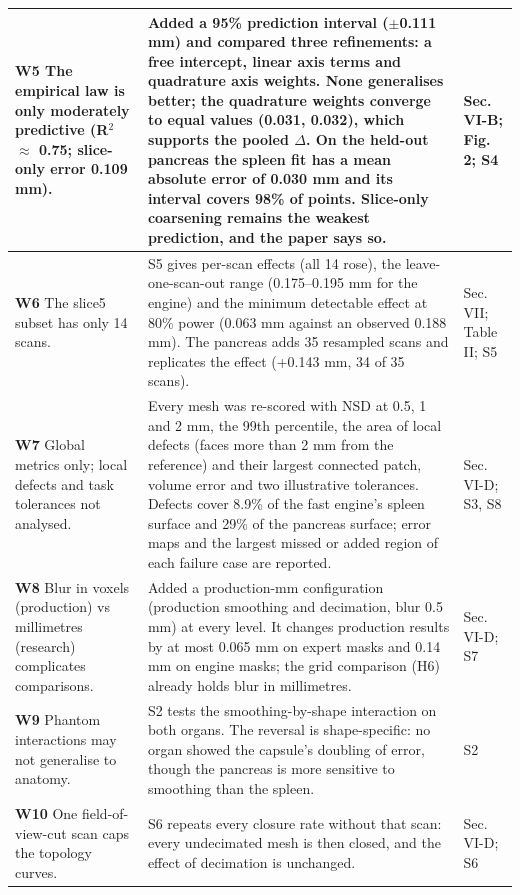\documentclass[11pt]{article}
\begin{document}
\begin{longtable}{@{}>{\raggedright\arraybackslash}p{}>{\raggedright\arraybackslash}p{}>{\raggedright\arraybackslash}p{}@{}}
\textbf{W5} The empirical law is only moderately predictive (R$^2$ $\approx$ 0.75; slice-only error 0.109 mm). & Added a 95\% prediction interval ($\pm$0.111 mm) and compared three refinements: a free intercept, linear axis terms and quadrature axis weights. None generalises better; the quadrature weights converge to equal values (0.031, 0.032), which supports the pooled $\Delta$. On the held-out pancreas the spleen fit has a mean absolute error of 0.030 mm and its interval covers 98\% of points. Slice-only coarsening remains the weakest prediction, and the paper says so. & Sec. VI-B; Fig. 2; S4 \\ \midrule
\textbf{W6} The slice5 subset has only 14 scans. & S5 gives per-scan effects (all 14 rose), the leave-one-scan-out range (0.175–0.195 mm for the engine) and the minimum detectable effect at 80\% power (0.063 mm against an observed 0.188 mm). The pancreas adds 35 resampled scans and replicates the effect (+0.143 mm, 34 of 35 scans). & Sec. VII; Table II; S5 \\ \midrule
\textbf{W7} Global metrics only; local defects and task tolerances not analysed. & Every mesh was re-scored with NSD at 0.5, 1 and 2 mm, the 99th percentile, the area of local defects (faces more than 2 mm from the reference) and their largest connected patch, volume error and two illustrative tolerances. Defects cover 8.9\% of the fast engine's spleen surface and 29\% of the pancreas surface; error maps and the largest missed or added region of each failure case are reported. & Sec. VI-D; S3, S8 \\ \midrule
\textbf{W8} Blur in voxels (production) vs millimetres (research) complicates comparisons. & Added a production-mm configuration (production smoothing and decimation, blur 0.5 mm) at every level. It changes production results by at most 0.065 mm on expert masks and 0.14 mm on engine masks; the grid comparison (H6) already holds blur in millimetres. & Sec. VI-D; S7 \\ \midrule
\textbf{W9} Phantom interactions may not generalise to anatomy. & S2 tests the smoothing-by-shape interaction on both organs. The reversal is shape-specific: no organ showed the capsule's doubling of error, though the pancreas is more sensitive to smoothing than the spleen. & S2 \\ \midrule
\textbf{W10} One field-of-view-cut scan caps the topology curves. & S6 repeats every closure rate without that scan: every undecimated mesh is then closed, and the effect of decimation is unchanged. & Sec. VI-D; S6 \\ \midrule

\end{longtable}
\end{document}

